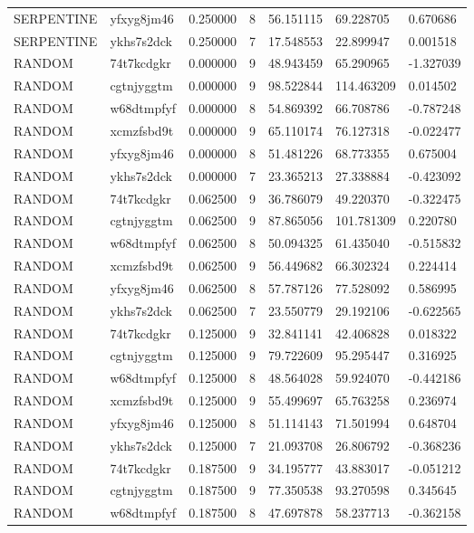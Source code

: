 \begin{tabular}{lllllll}
SERPENTINE & yfxyg8jm46 & 0.250000 & 8 & 56.151115 & 69.228705 & 0.670686 \\
SERPENTINE & ykhs7s2dck & 0.250000 & 7 & 17.548553 & 22.899947 & 0.001518 \\
RANDOM & 74t7kcdgkr & 0.000000 & 9 & 48.943459 & 65.290965 & -1.327039 \\
RANDOM & cgtnjyggtm & 0.000000 & 9 & 98.522844 & 114.463209 & 0.014502 \\
RANDOM & w68dtmpfyf & 0.000000 & 8 & 54.869392 & 66.708786 & -0.787248 \\
RANDOM & xcmzfsbd9t & 0.000000 & 9 & 65.110174 & 76.127318 & -0.022477 \\
RANDOM & yfxyg8jm46 & 0.000000 & 8 & 51.481226 & 68.773355 & 0.675004 \\
RANDOM & ykhs7s2dck & 0.000000 & 7 & 23.365213 & 27.338884 & -0.423092 \\
RANDOM & 74t7kcdgkr & 0.062500 & 9 & 36.786079 & 49.220370 & -0.322475 \\
RANDOM & cgtnjyggtm & 0.062500 & 9 & 87.865056 & 101.781309 & 0.220780 \\
RANDOM & w68dtmpfyf & 0.062500 & 8 & 50.094325 & 61.435040 & -0.515832 \\
RANDOM & xcmzfsbd9t & 0.062500 & 9 & 56.449682 & 66.302324 & 0.224414 \\
RANDOM & yfxyg8jm46 & 0.062500 & 8 & 57.787126 & 77.528092 & 0.586995 \\
RANDOM & ykhs7s2dck & 0.062500 & 7 & 23.550779 & 29.192106 & -0.622565 \\
RANDOM & 74t7kcdgkr & 0.125000 & 9 & 32.841141 & 42.406828 & 0.018322 \\
RANDOM & cgtnjyggtm & 0.125000 & 9 & 79.722609 & 95.295447 & 0.316925 \\
RANDOM & w68dtmpfyf & 0.125000 & 8 & 48.564028 & 59.924070 & -0.442186 \\
RANDOM & xcmzfsbd9t & 0.125000 & 9 & 55.499697 & 65.763258 & 0.236974 \\
RANDOM & yfxyg8jm46 & 0.125000 & 8 & 51.114143 & 71.501994 & 0.648704 \\
RANDOM & ykhs7s2dck & 0.125000 & 7 & 21.093708 & 26.806792 & -0.368236 \\
RANDOM & 74t7kcdgkr & 0.187500 & 9 & 34.195777 & 43.883017 & -0.051212 \\
RANDOM & cgtnjyggtm & 0.187500 & 9 & 77.350538 & 93.270598 & 0.345645 \\
RANDOM & w68dtmpfyf & 0.187500 & 8 & 47.697878 & 58.237713 & -0.362158 \\

\end{tabular}
